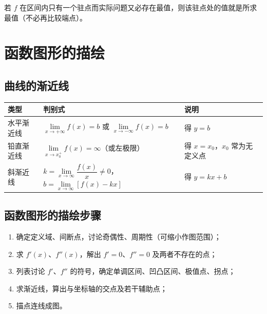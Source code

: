 \noindent 若 $f$ 在区间内只有一个驻点而实际问题又必存在最值，则该驻点处的值就是所求最值（不必再比较端点）。


\section{函数图形的描绘}

\subsection{曲线的渐近线}
\begin{center}
\begin{tabular}{@{}lll@{}}
\toprule
类型 & 判别式 & 说明 \\
\midrule
水平渐近线 & $\lim\limits_{x\to+\infty}f(x)=b$ 或 $\lim\limits_{x\to-\infty}f(x)=b$ & 得 $y=b$ \\
铅直渐近线 & $\lim\limits_{x\to x_0^{+}}f(x)=\infty$（或左极限） & 得 $x=x_0$，$x_0$ 常为无定义点 \\
斜渐近线 & $k=\lim\limits_{x\to\infty}\dfrac{f(x)}{x}\neq0$，$b=\lim\limits_{x\to\infty}[f(x)-kx]$ & 得 $y=kx+b$ \\
\bottomrule
\end{tabular}
\end{center}


\subsection{函数图形的描绘步骤}
\begin{enumerate}
    \item 确定定义域、间断点，讨论奇偶性、周期性（可缩小作图范围）；
    \item 求 $f'(x)$、$f''(x)$，解出 $f'=0$、$f''=0$ 及两者不存在的点；
    \item 列表讨论 $f'$、$f''$ 的符号，确定单调区间、凹凸区间、极值点、拐点；
    \item 求渐近线，算出与坐标轴的交点及若干辅助点；
    \item 描点连线成图。
\end{enumerate}

